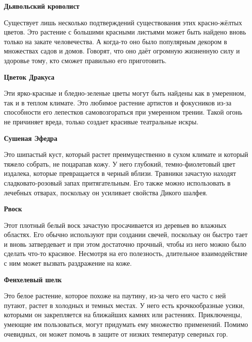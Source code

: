 \documentclass[a4paper, 9pt, twocolumn]{book}
\begin{document}
	\medspace
	
	\noindent \textbf{Дьявольский кроволист}
	
	\smallskip
	
	\noindent Существует лишь несколько подтверждений существования этих красно-жёлтых цветов. Это растение с большими красными листьями может быть найдено вновь только на закате человечества. А когда-то оно было популярным декором в множествах садов и домов. Говорят, что оно даёт огромную жизненную силу и здоровье тому, кто сможет правильно его приготовить.
	
	\medspace
	
	\noindent \textbf{Цветок Дракуса}
	
	\smallskip
	
	\noindent Эти ярко-красные и бледно-зеленые цветы могут быть найдены как в умеренном, так и в теплом климате. Это любимое растение артистов и фокусников из-за способности его лепестков самовозгораться при умеренном трении. Такой огонь не причиняет вреда, только создает красивые театральные искры.
	
	\medspace 
	
	\noindent \textbf{Сушеная  Эфедра}
	
	\smallskip 
	
	\noindent Это шипастый куст, который растет преимущественно в сухом климате и который тяжело собрать, не поцарапав кожу. У него глубокий, темно-фиолетовый цвет издалека, которые превращается в черный вблизи. Травники зачастую находят сладковато-розовый запах притягательным. Его также можно использовать в лечебных отварах, поскольку он усиливает свойства Дикого шалфея.
	
	\medspace
	
	\noindent \textbf{Рвоск}
	
	\smallskip
	
	\noindent Этот плотный белый воск зачастую просачивается из деревьев во влажных областях. Его обычно используют при создании свечей, поскольку он быстро тает и вновь затвердевает и при этом достаточно прочный, чтобы из него можно было сделать что-то красивое. Несмотря на его полезность, длительное взаимодействие с ним может вызвать раздражение на коже.
	
	\medspace
	
	\noindent \textbf{Фенхелевый шелк}
	
	\smallskip
	
	Это белое растение, которое похоже на паутину, из-за чего его часто с ней путают, растет в холодных и темных местах. У него есть крочкообразные усики, которыми он закрепляется на ближайших камнях или растениях. Приключенцы, умеющие им пользоваться, могут придумать ему множество применений. Помимо очевидных, он может помочь в защите от низких температур северных гор.
	
\end{document}
